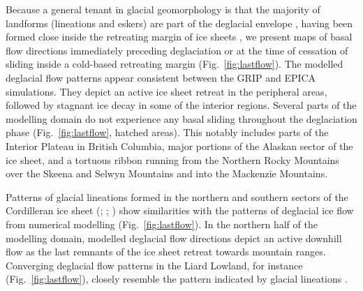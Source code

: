 \documentclass[tc]{copernicus}
\begin{document}
Because a general tenant in glacial geomorphology is that the majority of
landforms (lineations and eskers) are part of the deglacial envelope
\citep[terminology from][]{Kleman.etal.2006}, having been formed
close inside the retreating margin of ice sheets \citep{Boulton.Clark.1990,
Kleman.etal.1997, Kleman.etal.2010}, we present maps of basal flow directions
immediately preceding deglaciation or at the time of cessation of sliding
inside a cold-based retreating margin (Fig.~\ref{fig:lastflow}). The
modelled deglacial flow patterns appear consistent between the GRIP and EPICA
simulations. They depict an active ice sheet retreat in the peripheral areas,
followed by stagnant ice decay in some of the interior regions. Several parts
of the modelling domain do not experience any basal sliding throughout the
deglaciation phase (Fig.~\ref{fig:lastflow}, hatched areas). This notably
includes parts of the Interior Plateau in British Columbia, major
portions of the Alaskan sector of the ice sheet, and a tortuous ribbon running
from the Northern Rocky Mountains over the Skeena and Selwyn Mountains and into
the Mackenzie Mountains.

Patterns of glacial lineations formed in the northern and southern sectors of
the Cordilleran ice sheet (\citealp{Prest.etal.1968};
\citealp[Fig.~1.12]{Clague.1989}; \citealp[Fig.~2]{Kleman.etal.2010}) show
similarities with the patterns of deglacial ice flow from numerical modelling
(Fig.~\ref{fig:lastflow}). In the northern half
of the modelling domain, modelled deglacial flow directions depict an
active downhill flow as the last remnants of the ice sheet retreat towards
mountain ranges. Converging deglacial flow patterns in the Liard
Lowland, for instance (Fig.~\ref{fig:lastflow}), closely resemble the pattern
indicated by glacial lineations \citep[Fig.~2]{Margold.etal.2013}.
\end{document}
